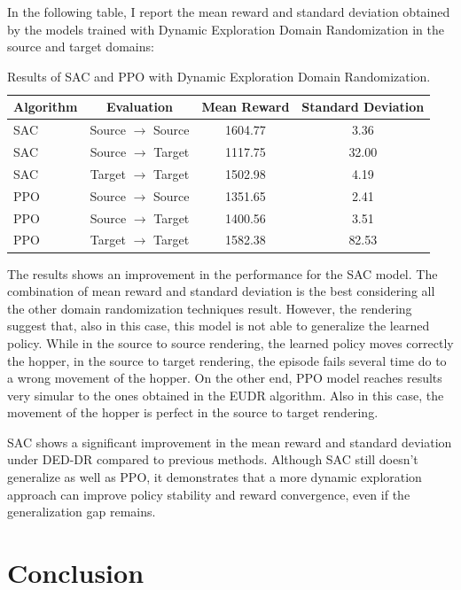 \documentclass[12pt]{article}
\begin{document}
In the following table, I report the mean reward and standard deviation obtained by the models trained with Dynamic Exploration Domain Randomization in the source and target domains:

\begin{table}[H]
    \centering
    \begin{tabular}{|l|c|c|c|}
        \hline
        \textbf{Algorithm} & \textbf{Evaluation} & \textbf{Mean Reward} & \textbf{Standard Deviation} \\ \hline
        SAC & Source $\rightarrow$ Source & 1604.77 & 3.36 \\ 
        SAC & Source $\rightarrow$ Target & 1117.75 & 32.00 \\ 
        SAC & Target $\rightarrow$ Target & 1502.98 & 4.19 \\ \hline
        PPO & Source $\rightarrow$ Source & 1351.65 & 2.41 \\ 
        PPO & Source $\rightarrow$ Target & 1400.56 & 3.51 \\ 
        PPO & Target $\rightarrow$ Target & 1582.38 & 82.53 \\ \hline
    \end{tabular}
    \caption{Results of SAC and PPO with Dynamic Exploration Domain Randomization.}
    \label{tab:results_dedr}
\end{table}

The results shows an improvement in the performance for the SAC model. The combination of mean reward and standard deviation is the best considering all the other domain randomization techniques result. However, the rendering suggest that, also in this case, this model is not able to generalize the learned policy. While in the source to source rendering, the learned policy moves correctly the hopper, in the source to target rendering, the episode fails several time do to a wrong movement of the hopper. 
On the other end, PPO model reaches results very simular to the ones obtained in the EUDR algorithm. Also in this case, the movement of the hopper is perfect in the source to target rendering. 

SAC shows a significant improvement in the mean reward and standard deviation under DED-DR compared to previous methods. Although SAC still doesn't generalize as well as PPO, it demonstrates that a more dynamic exploration approach can improve policy stability and reward convergence, even if the generalization gap remains.

\section{Conclusion}
\end{document}
